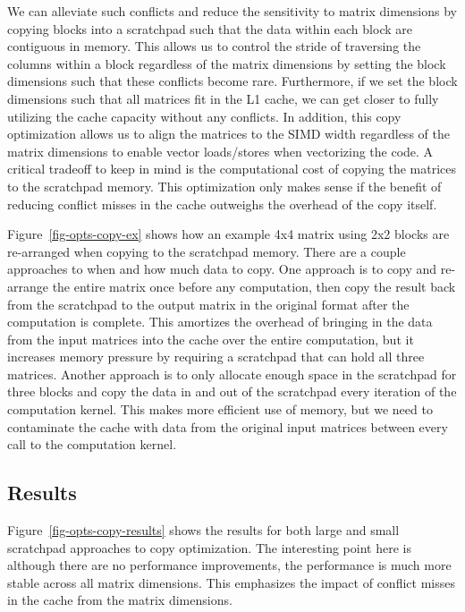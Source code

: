 We can alleviate such conflicts and reduce the sensitivity to matrix
dimensions by copying blocks into a scratchpad such that the data within
each block are contiguous in memory. This allows us to control the stride
of traversing the columns within a block regardless of the matrix
dimensions by setting the block dimensions such that these conflicts
become rare. Furthermore, if we set the block dimensions such that all
matrices fit in the L1 cache, we can get closer to fully utilizing the
cache capacity without any conflicts. In addition, this copy optimization
allows us to align the matrices to the SIMD width regardless of the
matrix dimensions to enable vector loads/stores when vectorizing the
code. A critical tradeoff to keep in mind is the computational cost of
copying the matrices to the scratchpad memory. This optimization only
makes sense if the benefit of reducing conflict misses in the cache
outweighs the overhead of the copy itself.
\smallskip

Figure~\ref{fig-opts-copy-ex} shows how an example 4x4 matrix using 2x2
blocks are re-arranged when copying to the scratchpad memory. There are a
couple approaches to when and how much data to copy. One approach is to
copy and re-arrange the entire matrix once before any computation, then
copy the result back from the scratchpad to the output matrix in the
original format after the computation is complete. This amortizes the
overhead of bringing in the data from the input matrices into the cache
over the entire computation, but it increases memory pressure by
requiring a scratchpad that can hold all three matrices. Another approach
is to only allocate enough space in the scratchpad for three blocks and
copy the data in and out of the scratchpad every iteration of the
computation kernel. This makes more efficient use of memory, but we need
to contaminate the cache with data from the original input matrices
between every call to the computation kernel.
\smallskip

\subsection{Results}



Figure~\ref{fig-opts-copy-results} shows the results for both large and
small scratchpad approaches to copy optimization. The interesting point
here is although there are no performance improvements, the performance
is much more stable across all matrix dimensions. This emphasizes the
impact of conflict misses in the cache from the matrix dimensions.

